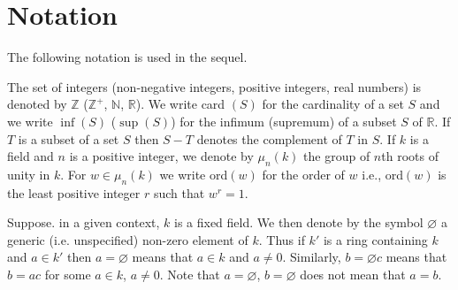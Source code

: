 
\chapter{Notation}


The following notation is used in the sequel.

The set of integers (\resp non-negative integers, positive integers,
real numbers) is denoted by $\mathbb{Z}$ (\resp $\mathbb{Z}^+$,
$\mathbb{N}$, $\mathbb{R}$). We write card $(S)$ for the cardinality
of a set $S$ and we write $\inf (S)$ (\resp $\sup (S)$) for the
infimum (\resp supremum) of a subset $S$ of $\mathbb{R}$. If $T$ is a
subset of a set $S$ then $S-T$ denotes the complement of $T$ in
$S$. If $k$ is a field and $n$ is a positive integer, we denote by
$\mu_n(k)$ the group of $n$th roots of unity in $k$. For $w \in \mu_n
(k)$ we write ord$(w)$ for the order of $w$ i.e., ord$(w)$ is the
least positive integer $r$ such that $w^r=1$. 

Suppose. in a given context, $k$ is a fixed field. We then denote by
the symbol $\diameter$ a generic (i.e. unspecified) non-zero element
of $k$. Thus if $k'$ is a ring containing $k$ and $a \in k'$ then $a=
\diameter$ means that $a \in k$ and $a \neq 0$. Similarly, $b=
\diameter c$ means that $b=ac$ for some $a \in k$, $a \neq 0$. Note
that $a = \diameter$, $b= \diameter$ does not mean that $a=b$. 

